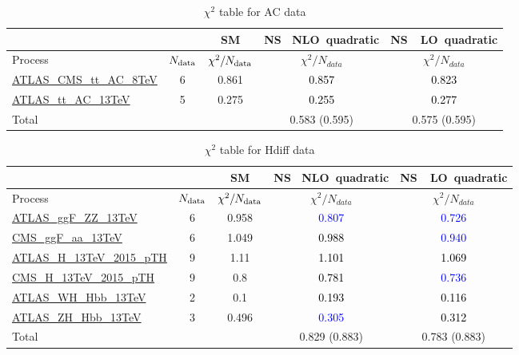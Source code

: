 \documentclass{article}
\begin{document}
\begin{table}[H]
\centering
\begin{tabular}{|l|c|c|c|c|}
\hline
 \multicolumn{2}{|c|}{} & SM& \rm NS \ NLO\ quadratic& \rm NS\ \ LO\ quadratic\\ \hline
Process & $N_{\rm data}$ & $\chi^ 2/N_{\rm data}$& $\chi^ 2/N_{data}$& $\chi^ 2/N_{data}$\\ \hline
\href{https://arxiv.org/abs/1709.05327}{ATLAS_CMS_tt_AC_8TeV} & 6 & 0.861 & \textcolor{black}                            {0.857} & \textcolor{black}                            {0.823} \\ \hline
\href{https://cds.cern.ch/record/2682109}{ATLAS_tt_AC_13TeV} & 5 & 0.275 & \textcolor{black}                            {0.255} & \textcolor{black}                            {0.277} \\ \hline
\hline Total & &  & 0.583 (0.595) & 0.575 (0.595) \\ \hline
\end{tabular}
\caption{$\chi^2$ table for AC data}
\end{table}
\begin{table}[H]
\centering
\begin{tabular}{|l|c|c|c|c|}
\hline
 \multicolumn{2}{|c|}{} & SM& \rm NS \ NLO\ quadratic& \rm NS\ \ LO\ quadratic\\ \hline
Process & $N_{\rm data}$ & $\chi^ 2/N_{\rm data}$& $\chi^ 2/N_{data}$& $\chi^ 2/N_{data}$\\ \hline
\href{https://arxiv.org/abs/1909.02845}{ATLAS_ggF_ZZ_13TeV} & 6 & 0.958 & \textcolor{blue}                            {0.807} & \textcolor{blue}                            {0.726} \\ \hline
\href{https://inspirehep.net/literature/1725274}{CMS_ggF_aa_13TeV} & 6 & 1.049 & \textcolor{black}                            {0.988} & \textcolor{blue}                            {0.940} \\ \hline
\href{https://inspirehep.net/literature/1743896}{ATLAS_H_13TeV_2015_pTH} & 9 & 1.11 & \textcolor{black}                            {1.101} & \textcolor{black}                            {1.069} \\ \hline
\href{https://arxiv.org/abs/1812.06504}{CMS_H_13TeV_2015_pTH} & 9 & 0.8 & \textcolor{black}                            {0.781} & \textcolor{blue}                            {0.736} \\ \hline
\href{https://arxiv.org/abs/1903.04618}{ATLAS_WH_Hbb_13TeV} & 2 & 0.1 & \textcolor{black}                            {0.193} & \textcolor{black}                            {0.116} \\ \hline
\href{https://arxiv.org/abs/1903.04618}{ATLAS_ZH_Hbb_13TeV} & 3 & 0.496 & \textcolor{blue}                            {0.305} & \textcolor{black}                            {0.312} \\ \hline
\hline Total & &  & 0.829 (0.883) & 0.783 (0.883) \\ \hline
\end{tabular}
\caption{$\chi^2$ table for Hdiff data}
\end{table}
\end{document}
